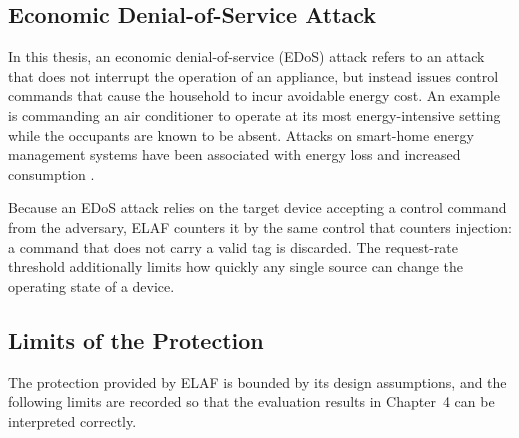 \subsection{Economic Denial-of-Service Attack}

In this thesis, an economic denial-of-service (EDoS) attack refers to an attack that does not interrupt the operation of an appliance, but instead issues control commands that cause the household to incur avoidable energy cost. An example is commanding an air conditioner to operate at its most energy-intensive setting while the occupants are known to be absent. Attacks on smart-home energy management systems have been associated with energy loss and increased consumption \citep{alkatheiriCyberSecurityFramework2021}.

Because an EDoS attack relies on the target device accepting a control command from the adversary, ELAF counters it by the same control that counters injection: a command that does not carry a valid tag is discarded. The request-rate threshold additionally limits how quickly any single source can change the operating state of a device.

\subsection{Limits of the Protection}
\label{sec:m-attack-limits}

The protection provided by ELAF is bounded by its design assumptions, and the following limits are recorded so that the evaluation results in Chapter~4 can be interpreted correctly.

